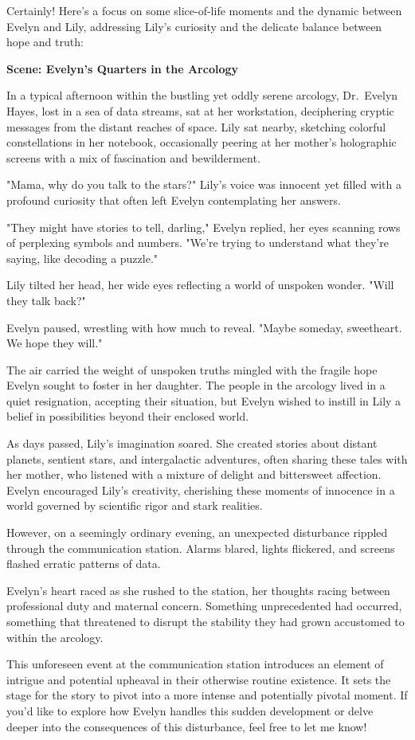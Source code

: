 \begin{aquote}
    Certainly! Here's a focus on some slice-of-life moments and the dynamic between Evelyn and Lily, addressing Lily's curiosity and the delicate balance between hope and truth:\medskip

    \noindent\textbf{Scene: Evelyn's Quarters in the Arcology}

    In a typical afternoon within the bustling yet oddly serene arcology, Dr.~Evelyn Hayes, lost in a sea of data streams, sat at her workstation, deciphering cryptic messages from the distant reaches of space. Lily sat nearby, sketching colorful constellations in her notebook, occasionally peering at her mother's holographic screens with a mix of fascination and bewilderment.

    "Mama, why do you talk to the stars?" Lily's voice was innocent yet filled with a profound curiosity that often left Evelyn contemplating her answers.

    "They might have stories to tell, darling," Evelyn replied, her eyes scanning rows of perplexing symbols and numbers. "We're trying to understand what they're saying, like decoding a puzzle."

    Lily tilted her head, her wide eyes reflecting a world of unspoken wonder. "Will they talk back?"

    Evelyn paused, wrestling with how much to reveal. "Maybe someday, sweetheart. We hope they will."

    The air carried the weight of unspoken truths mingled with the fragile hope Evelyn sought to foster in her daughter. The people in the arcology lived in a quiet resignation, accepting their situation, but Evelyn wished to instill in Lily a belief in possibilities beyond their enclosed world.

    As days passed, Lily's imagination soared. She created stories about distant planets, sentient stars, and intergalactic adventures, often sharing these tales with her mother, who listened with a mixture of delight and bittersweet affection. Evelyn encouraged Lily's creativity, cherishing these moments of innocence in a world governed by scientific rigor and stark realities.

    However, on a seemingly ordinary evening, an unexpected disturbance rippled through the communication station. Alarms blared, lights flickered, and screens flashed erratic patterns of data.

    Evelyn's heart raced as she rushed to the station, her thoughts racing between professional duty and maternal concern. Something unprecedented had occurred, something that threatened to disrupt the stability they had grown accustomed to within the arcology.\medskip

    This unforeseen event at the communication station introduces an element of intrigue and potential upheaval in their otherwise routine existence. It sets the stage for the story to pivot into a more intense and potentially pivotal moment. If you'd like to explore how Evelyn handles this sudden development or delve deeper into the consequences of this disturbance, feel free to let me know!
\end{aquote}

